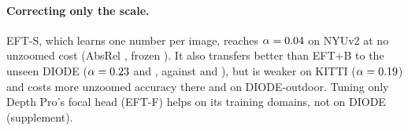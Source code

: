 \paragraph{Correcting only the scale.}
EFT-S, which learns one number per image, reaches $\alpha=0.04$ on NYUv2 at no unzoomed cost
(AbsRel \DavTwoSScaleNyuAbsrelOne, frozen \DavTwoSFixedNyuAbsrelOne). It also transfers better than EFT+B to the unseen
DIODE ($\alpha=0.23$ and \DavTwoSScaleDiodeOutAlpha, against \DavTwoSEftbDiodeInAlpha{} and
\DavTwoSEftbDiodeOutAlpha), but is weaker on KITTI ($\alpha=0.19$) and costs more unzoomed accuracy there and on DIODE-outdoor. Tuning only Depth Pro's focal head (EFT-F)
helps on its training domains, not on DIODE (supplement).
